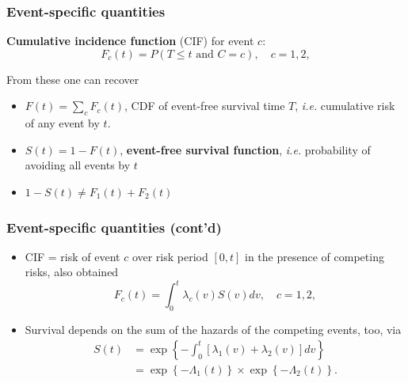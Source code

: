 \documentclass[handout,12pt,dvipsnames,t]{beamer}
\begin{document}
\begin{frame}
\frametitle{Event-specific quantities}

\textbf{Cumulative incidence function} (CIF) for event $c$:
\[  F_c(t) = P(T \leq t \text{ and } C = c ), \quad c = 1,2,  \]

\medskip
From these one can recover
\begin{itemize}
\item
$F(t) = \sum_{c} F_c(t)$, CDF of event-free survival time $T$, \textit{i.e.} 
cumulative risk of any event by $t$.
\medskip
\item
$S(t) = 1 - F(t)$, \textbf{event-free survival function}, \textit{i.e.} probability of avoiding all events by $t$
\medskip
\item
$1-S(t) \neq F_1(t)+F_2(t)$

\end{itemize}
\end{frame}


\begin{frame}
\frametitle{Event-specific quantities (cont'd)}
\begin{itemize}
\item CIF = risk of event $c$ over risk period $[0,t]$ in the presence of competing risks, also obtained 
$$ F_c(t) = \int_0^t \lambda_c(v) S(v) dv, \quad c = 1,2, $$
\item
Survival depends on the sum of the hazards of the competing events, too, 
via 
\begin{align*} 
S(t) & = \exp\left\{ - \int_0^t [\lambda_1(v) + \lambda_2(v)]dv 
 \right\} \\
 & = \exp\left\{ - \Lambda_1(t) \right\} \times        \exp\left\{ - \Lambda_2(t) \right\} .
\end{align*}
\end{itemize}
\end{frame} 
\end{document}

